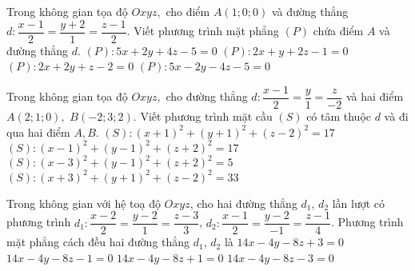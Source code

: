 	\begin{ex}%
	Trong không gian tọa độ $Oxyz,$ cho điểm $A(1; 0; 0)$ và đường thẳng $d\colon \dfrac{x-1}{2}=\dfrac{y+2}1=\dfrac{z-1}{2}.$ Viết phương trình mặt phẳng $(P)$ chứa điểm $A$ và đường thẳng $d$.
	\choice
	{$(P)\colon 5x+2y+4z-5=0$}
	{$(P)\colon 2x+y+2z-1=0$}
	{$(P)\colon 2x+2y+z-2=0$}
	{\True $(P)\colon 5x-2y-4z-5=0$}
	\end{ex}
	\begin{ex}%
	Trong không gian tọa độ $Oxyz,$ cho đường thẳng $d\colon \dfrac{x-1}{2}=\dfrac{y}1=\dfrac{z}{-2}$ và hai điểm $A(2; 1; 0),$ $ B(-2; 3; 2).$ Viết phương trình mặt cầu $(S)$ có tâm thuộc $d$ và đi qua hai điểm $A, B$.
	\choice
	{\True $(S)\colon (x+1)^2+(y+1)^2+(z-2)^2=17$}
	{$(S)\colon (x-1)^2+(y-1)^2+(z+2)^2=17$}
	{$(S)\colon (x-3)^2+(y-1)^2+(z+2)^2=5$}
	{$(S)\colon (x+3)^2+(y+1)^2+(z-2)^2=33$}
	\end{ex}
	\begin{ex}%
	Trong không gian với hệ toạ độ $Oxyz$, cho hai đường thẳng $d_1$, $d_2$ lần lượt có phương trình $d_1\colon \dfrac{x-2}{2}=\dfrac{y-2}{1}=\dfrac{z-3}{3}$, $d_2\colon\dfrac{x-1}{2}=\dfrac{y-2}{-1}=\dfrac{z-1}{4}$. Phương trình mặt phẳng cách đều hai đường thẳng $d_1$, $d_2$ là
	\choice
	{\True $14x-4y-8z+3=0$}
	{$14x-4y-8z-1=0$}
	{$14x-4y-8z+1=0$}
	{$14x-4y-8z-3=0$}
	\end{ex}
